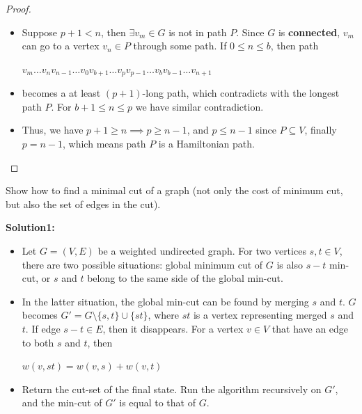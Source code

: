 \documentclass{article}
\newcounter{exercise}
\newcommand{\<}{
    \langle}
\renewcommand{\>}{
    \rangle}
\begin{document}
{\begin{proof}
\begin{itemize}
        \item Suppose $p+1 < n$, then $\exists v_m \in G$ is not in path $P$. Since $G$ is \textbf{connected}, $v_m$ can go to a vertex $v_n\in P$ through some path. If $0\leq n\leq b$, then path
        \begin{center} 
            $v_m \ldots  v_n v_{n-1} \ldots  v_0 v_{b+1} \ldots  v_{p} v_{p-1} \ldots  v_{b} v_{b-1} \ldots  v_{n+1}$ 
        \end{center}
        \item becomes a at least $(p+1)$-long path, which contradicts with the longest path $P$. For $b+1\leq n\leq p$ we have similar contradiction. 
        \item Thus, we have $p+1 \geq n\implies p\geq n-1$, and $p \leq n-1$ since $P \subseteq V$, finally $p=n-1$, which means path $P$ is a Hamiltonian path.
    \end{itemize}
    
\end{proof}


\newpage

\begin{exercise}
Show how to find a minimal cut of a graph (not only the cost of minimum cut, but also the set of edges in the cut).
\end{exercise}

\textbf{Solution1:}

    \begin{itemize}
        \item Let $G=(V,E)$ be a weighted undirected graph. For two vertices $s,t\in V$, there are two possible situations: global minimum cut of $G$ is also $s-t$ min-cut, or $s$ and $t$ belong to the same side of the global min-cut.
        \item In the latter situation, the global min-cut can be found by merging $s$ and $t$. $G$ becomes $G'=G\setminus \{s,t\}\cup \{st\}$, where $st$ is a vertex representing merged $s$ and $t$. If edge $s-t\in E$, then it disappears. For a vertex $v\in V$ that have an edge to both $s$ and $t$, then
        \begin{center}
             $w(v,st)=w(v,s)+w(v,t)$
        \end{center}
        \item Return the cut-set of the final state. Run the algorithm recursively on $G'$, and the min-cut of $G'$ is equal to that of $G$.
        

\end{itemize}}
\end{document}
